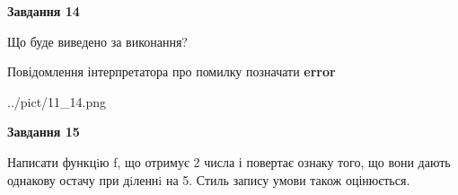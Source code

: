 \documentclass[11pt, ukrainian]{article}
\begin{document}
{\begin {large}
{\begin {center}\textbf{Завдання 14}\end {center}}\par
Що буде виведено за виконання? \par
Повідомлення інтерпретатора про помилку позначати \textbf{error}

\begin{center}
	{../pict/11_14.png}
\end{center}
\newpage

{\begin {center}\textbf{Завдання 15}\end {center}}\par

Написати функцiю f, що отримує 2 числа і повертає ознаку того, що вони дають однакову остачу при дiленнi на 5. Стиль запису умови також оцінюється.\par
\newpage

\end {large}}
\end{document}
